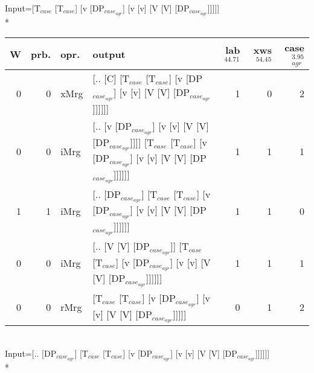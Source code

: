 \begingroup\scriptsize Input=[T$_{case}$ [T$_{case}$] [v [DP$_{case_{agr}}$] [v [v] [V [V] [DP$_{case_{agr}}$]]]]]\\*
\begin{tabularx}{\linewidth}{rrlXrrr}
\hline
   W &   prb. & opr.   & output                                                                                                                 &   lab$^{44.71}$ &   xws$^{54.45}$ &   case$_{agr}^{3.95}$ \\
\hline
   0 &   0 & xMrg & [.. [C] [T$_{case}$ [T$_{case}$] [v [DP$_{case_{agr}}$] [v [v] [V [V] [DP$_{case_{agr}}$]]]]]]                                             &             1 &             0 &                  2 \\
   0 &   0 & iMrg & [.. [v [DP$_{case_{agr}}$] [v [v] [V [V] [DP$_{case_{agr}}$]]]] [T$_{case}$ [T$_{case}$] [v [DP$_{case_{agr}}$] [v [v] [V [V] [DP$_{case_{agr}}$]]]]]] &             1 &             1 &                  1 \\
   1 &   1 & iMrg & [.. [DP$_{case_{agr}}$] [T$_{case}$ [T$_{case}$] [v [DP$_{case_{agr}}$] [v [v] [V [V] [DP$_{case_{agr}}$]]]]]]                                   &             1 &             1 &                  0 \\
   0 &   0 & iMrg & [.. [V [V] [DP$_{case_{agr}}$]] [T$_{case}$ [T$_{case}$] [v [DP$_{case_{agr}}$] [v [v] [V [V] [DP$_{case_{agr}}$]]]]]]                           &             1 &             1 &                  1 \\
   0 &   0 & rMrg & [T$_{case}$ [T$_{case}$] [v [DP$_{case_{agr}}$] [v [v] [V [V] [DP$_{case_{agr}}$]]]]]                                                      &             0 &             1 &                  2 \\
\hline
\end{tabularx}\endgroup\\
\begingroup\scriptsize Input=[.. [DP$_{case_{agr}}$] [T$_{case}$ [T$_{case}$] [v [DP$_{case_{agr}}$] [v [v] [V [V] [DP$_{case_{agr}}$]]]]]]\\*

